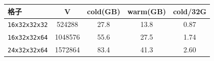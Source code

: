 \begin{tabular}{lcccc}
\hline
格子 & V & cold(GB) & warm(GB) & cold/32G \\
\hline
\texttt{16x32x32x32} & 524288 & 27.8 & 13.8 & 0.87 \\
\texttt{16x32x32x64} & 1048576 & 55.6 & 27.5 & 1.74 \\
\texttt{24x32x32x64} & 1572864 & 83.4 & 41.3 & 2.60 \\
\hline
\end{tabular}
